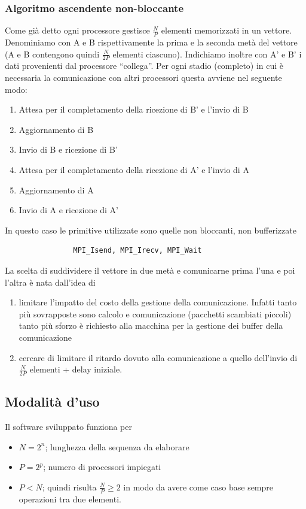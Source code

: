 \documentclass[12pt,a4paper,oneside,openright]{article}
\begin{document}
\subsubsection{Algoritmo ascendente non-bloccante}
Come già detto ogni processore gestisce $\frac{N}{P}$ elementi memorizzati in un vettore.\\
Denominiamo con A e B rispettivamente la prima e la seconda metà del vettore (A e B contengono quindi $\frac{N}{2P}$ elementi ciascuno). Indichiamo inoltre con A' e B' i dati provenienti dal processore ``collega''.
Per ogni stadio (completo) in cui è necessaria la comunicazione con altri processori questa avviene nel seguente modo:
\begin{enumerate}
\item Attesa per il completamento della ricezione di B' e l'invio di B
\item Aggiornamento di B
\item Invio di B e ricezione di B' 
\item Attesa per il completamento della ricezione di A' e l'invio di A
\item Aggiornamento di A
\item Invio di A e ricezione di A'  
\end{enumerate}
In questo caso le primitive utilizzate sono quelle non bloccanti, non bufferizzate
\begin{center}
\begin{verbatim}
                MPI_Isend, MPI_Irecv, MPI_Wait 
\end{verbatim} 
\end{center}
La scelta di suddividere il vettore in due metà e comunicarne prima l'una e poi l'altra è nata dall'idea di
\begin{enumerate}
\item limitare l'impatto del costo della gestione della comunicazione. Infatti tanto più sovrapposte sono calcolo e comunicazione (pacchetti scambiati piccoli) tanto più sforzo è richiesto alla macchina per la gestione dei buffer della comunicazione
\item cercare di limitare il ritardo dovuto alla comunicazione a quello dell'invio di $\frac{N}{2P}$ elementi + delay iniziale. 
\end{enumerate}

\subsection{Modalità d'uso}

Il software sviluppato funziona per
\begin{itemize}
\item $N=2^{n}$; lunghezza della sequenza da elaborare
\item $P=2^{p}$; numero di processori impiegati
\item $P<N$; quindi risulta $\frac{N}{P}\geq 2$ in modo da avere come caso base sempre operazioni tra due elementi.
\end{itemize}
\end{document}

